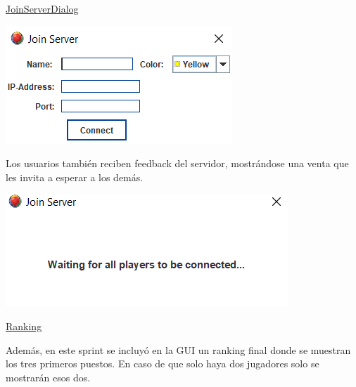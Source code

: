 \documentclass[../DocumentoOficial.tex]{subfiles}
\begin{document}
\underline{JoinServerDialog}
\begin{center}
\includegraphics[scale=1]{join-server-sprint-6.png}
\end{center}

Los usuarios también reciben feedback del servidor, mostrándose una venta que les invita a esperar a los demás.

\begin{center}
\includegraphics[scale=0.85]{user-feedback.png}
\end{center}

\underline{Ranking}

Además, en este sprint se incluyó en la GUI un ranking final donde se muestran los tres primeros puestos. En caso de que solo haya dos jugadores solo se mostrarán esos dos.
\end{document}
